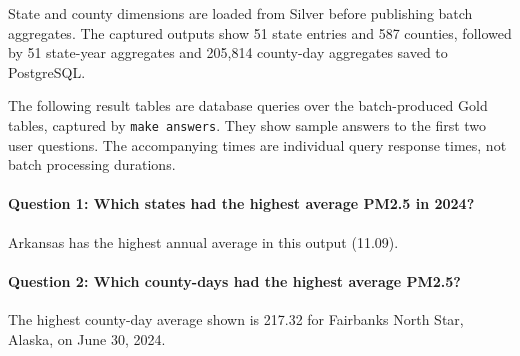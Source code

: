 \documentclass[11pt,letterpaper]{article}
\newcommand{\evidenceroot}{evidence/run-59ewk1}
\newcommand{\evidenceroot}{documentation/evidence/run-59ewk1}
\begin{document}
\noindent\begin{minipage}{\linewidth}

\end{minipage}


State and county dimensions are loaded from Silver before publishing batch
aggregates. The captured outputs show 51 state entries and 587 counties,
followed by 51 state-year aggregates and 205,814 county-day aggregates saved
to PostgreSQL.

\noindent\begin{minipage}{\linewidth}

\end{minipage}


\noindent\begin{minipage}{\linewidth}

\end{minipage}


The following result tables are database queries over the batch-produced Gold
tables, captured by \texttt{make answers}. They show sample answers to the first
two user questions. The accompanying times are individual query response times,
not batch processing durations.

\paragraph{Question 1: Which states had the highest average PM2.5 in 2024?}
Arkansas has the highest annual average in this output (11.09).

\noindent\begin{minipage}{\linewidth}

\end{minipage}


\paragraph{Question 2: Which county-days had the highest average PM2.5?}
The highest county-day average shown is 217.32 for Fairbanks North Star,
Alaska, on June 30, 2024.
\end{document}
